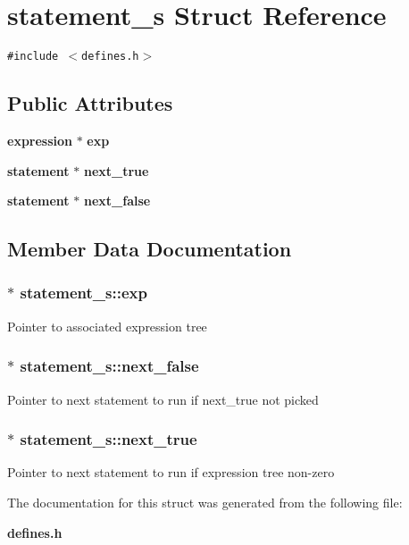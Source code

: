 \section{statement\_\-s Struct Reference}
\label{structstatement__s}
{\tt \#include $<$defines.h$>$}

\subsection*{Public Attributes}
\begin{CompactItemize}
\item 
{\bf expression} $\ast$ {\bf exp}
\item 
{\bf statement} $\ast$ {\bf next\_\-true}
\item 
{\bf statement} $\ast$ {\bf next\_\-false}
\end{CompactItemize}


\subsection{Member Data Documentation}
\subsubsection{$\ast$ statement\_\-s::exp}\label{structstatement__s_m0}


Pointer to associated expression tree 
\subsubsection{$\ast$ statement\_\-s::next\_\-false}\label{structstatement__s_m2}


Pointer to next statement to run if next\_\-true not picked 
\subsubsection{$\ast$ statement\_\-s::next\_\-true}\label{structstatement__s_m1}


Pointer to next statement to run if expression tree non-zero 

The documentation for this struct was generated from the following file:\begin{CompactItemize}
\item 
{\bf defines.h}\end{CompactItemize}
